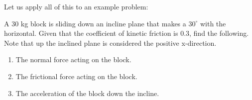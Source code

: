 Let us apply all of this to an example problem:
\begin{Exercise}[title=Box sliding down an incline, label=incline1]
    A 30 kg block is sliding down an incline plane that makes a $30^\circ$ with the horizontal. Given that the coefficient of kinetic friction is 0.3, find the following. Note that up the inclined plane is considered the positive x-direction.
    \begin{enumerate}[label=(\alph*)]
        \item The normal force acting on the block.
        \item The frictional force acting on the block.
        \item The acceleration of the block down the incline.
    \end{enumerate}

\begin{center}
    

  

\begin{tikzpicture}[x=0.75pt,y=0.75pt,yscale=-1,xscale=1]


\end{tikzpicture}
\end{center}
\end{Exercise}
